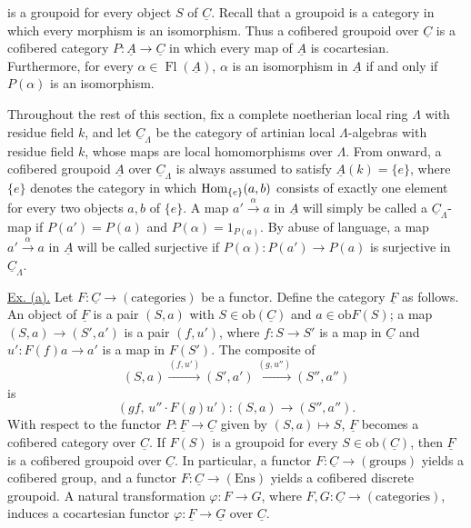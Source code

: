 is a groupoid for every object $S$ of $\underline C$. Recall that a
groupoid is a category in which every morphism is an isomorphism. Thus a
cofibered groupoid over $\underline C$ is a cofibered category
$P:\underline A\longrightarrow\underline C$ in which every map of
$\underline A$ is cocartesian. Furthermore, for every
$\alpha\in\operatorname{Fl}(\underline A)$, $\alpha$ is an isomorphism
in $\underline A$ if and only if $P(\alpha)$ is an isomorphism.

Throughout the rest of this section, fix a complete noetherian local ring
$\Lambda$ with residue field $k$, and let $\underline C_\Lambda$ be the
category of artinian local $\Lambda$-algebras with residue field $k$,
whose maps are local homomorphisms over $\Lambda$. From  onward, a
cofibered groupoid $\underline A$ over $\underline C_\Lambda$ is always
assumed to satisfy $\underline A(k)=\{e\}$, where $\{e\}$ denotes the
category in which $\operatorname{Hom}_{\{e\}}(a,b)$ consists of exactly one element
for every two objects $a,b$ of $\{e\}$. A map
$a'\xrightarrow{\alpha}a$ in $\underline A$ will simply be called a
$\underline C_\Lambda$-map if $P(a')=P(a)$ and
$P(\alpha)=1_{P(a)}$. By abuse of language, a map
$a'\xrightarrow{\alpha}a$ in $\underline A$ will be called surjective
if $P(\alpha):P(a')\longrightarrow P(a)$ is surjective in
$\underline C_\Lambda$.

\underline{Ex. (a).} Let
$F:\underline C\longrightarrow(\text{categories})$ be a functor.
Define the category $\underline F$ as follows. An object of
$\underline F$ is a pair $(S,a)$ with
$S\in\mathrm{ob}(\underline C)$ and $a\in\mathrm{ob}F(S)$; a map
$(S,a)\longrightarrow(S',a')$ is a pair $(f,u')$, where
$f:S\longrightarrow S'$ is a map in $\underline C$ and
$u':F(f)a\longrightarrow a'$ is a map in $F(S')$. The composite of
\[
 (S,a)\xrightarrow{(f,u')}(S',a')
 \xrightarrow{(g,u'')}(S'',a'')
\]
is
\[
 (gf,\,u''\mathbin{\cdot}F(g)u'):(S,a)\longrightarrow(S'',a'').
\]
With respect to the functor
$P:\underline F\longrightarrow\underline C$ given by
$(S,a)\longmapsto S$, $\underline F$ becomes a cofibered category over
$\underline C$. If $F(S)$ is a groupoid for every
$S\in\mathrm{ob}(\underline C)$, then $\underline F$ is a cofibered
groupoid over $\underline C$. In particular, a functor
$F:\underline C\longrightarrow(\text{groups})$ yields a cofibered
group, and a functor $F:\underline C\longrightarrow(\mathrm{Ens})$
yields a cofibered discrete groupoid. A natural transformation
$\varphi:F\longrightarrow G$, where $F,G:\underline C\longrightarrow
(\text{categories})$, induces a cocartesian functor
$\varphi:\underline F\longrightarrow\underline G$ over $\underline C$.

